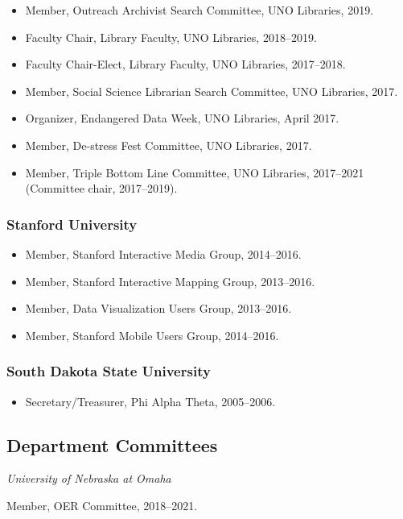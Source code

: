 \documentclass[10pt]{article}
\begin{document}
\begin{itemize}
  \item Member, Outreach Archivist Search Committee, UNO Libraries, 2019.
  \item Faculty Chair, Library Faculty, UNO Libraries, 2018--2019.
  \item Faculty Chair-Elect, Library Faculty, UNO Libraries, 2017--2018.
  \item Member, Social Science Librarian Search Committee, UNO Libraries, 2017.
  \item Organizer, Endangered Data Week, UNO Libraries, April 2017.
  \item Member, De-stress Fest Committee, UNO Libraries, 2017.
  \item Member, Triple Bottom Line Committee, UNO Libraries, 2017--2021 (Committee chair, 2017--2019).
\end{itemize}

\subsubsection*{Stanford University}

\begin{itemize}
  \item Member, Stanford Interactive Media Group, 2014--2016.
  \item Member, Stanford Interactive Mapping Group, 2013--2016.
  \item Member, Data Visualization Users Group, 2013--2016.
  \item Member, Stanford Mobile Users Group, 2014--2016.
\end{itemize}

\subsubsection*{South Dakota State University}

\begin{itemize}
  \item Secretary/Treasurer, Phi Alpha Theta, 2005--2006.
\end{itemize}

\subsection{Department Committees}

\textit{University of Nebraska at Omaha}

Member, OER Committee, 2018--2021.
\end{document}
